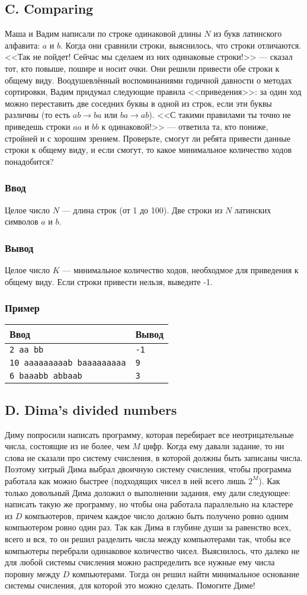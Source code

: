 \documentclass[10pt, a4paper]{article}
\newcommand{\informat}[1]
{
	\subsubsection*{Ввод} #1
}
\newcommand{\outformat}[1]
{
	\subsubsection*{Вывод} #1
}
\newcommand{\exampleee}[6]
{
	\subsubsection*{Пример}
	\noindent
	\begin{center}
	\begin{tabularx}{\linewidth}{|X|X|}
	\hline
	Ввод 	& Вывод  	\\
	\hline
	{\tt #1} & {\tt #2}	\\
	\hline
	{\tt #3} & {\tt #4}	\\
	\hline
	{\tt #5} & {\tt #6}	\\
	\hline
	\end{tabularx}
	\end{center}
}
\begin{document}
\subsection*{C. Comparing}

Маша и Вадим написали по строке одинаковой длины $N$ из букв латинского алфавита: $a$ и $b$. Когда они сравнили строки, выяснилось, что строки отличаются. <<Так не пойдет! Сейчас мы сделаем из них одинаковые строки!>> --- сказал тот, кто повыше, пошире и носит очки. Они решили привести обе строки к общему виду. Воодушевлённый воспоминаниями годичной давности о методах сортировки, Вадим придумал следующие правила <<приведения>>: за один ход можно переставить две соседних буквы в одной из строк, если эти буквы различны (то есть $ab \rightarrow ba$ или $ba \rightarrow ab$). <<С такими правилами ты точно не приведешь строки $aa$ и $bb$ к одинаковой!>> --- ответила та, кто пониже, стройней и с хорошим зрением. Проверьте, смогут ли ребята привести данные строки к общему виду, и если смогут, то какое минимальное количество ходов понадобится?

\informat{Целое число $N$ --- длина строк (от 1 до 100). Две строки из $N$ латинских символов $a$ и $b$.}

\outformat{Целое число $K$ --- минимальное количество ходов, необходмое для приведения к общему виду. Если строки привести нельзя, выведите -1.}

\exampleee{2 \newline aa \newline bb}{-1}{10 \newline aaaaaaaaab \newline baaaaaaaaa}{9}{6 \newline baaabb \newline abbaab}{3}



\subsection*{D. Dima's divided numbers}

Диму попросили написать программу, которая перебирает все неотрицательные числа, состоящие из не более, чем $M$ цифр. Когда ему давали задание, то ни слова не сказали про систему счисления, в которой должны быть записаны числа. Поэтому хитрый Дима выбрал двоичную систему счисления, чтобы программа работала как можно быстрее (подходящих чисел в ней всего лишь $2^M$). Как только довольный Дима доложил о выполнении задания, ему дали следующее: написать такую же программу, но чтобы она работала параллельно на кластере из $D$ компьютеров, причем каждое число должно быть получено ровно одним компьютером ровно один раз. Так как Дима в глубине души за равенство всех, всего и вся, то он решил разделить числа между компьютерами так, чтобы все компьютеры перебрали одинаковое количество чисел. Выяснилось, что далеко не для любой системы счисления можно распределить все нужные ему числа поровну между $D$ компьютерами. Тогда он решил найти минимальное основание системы счисления, для которой это можно сделать. Помогите Диме! 
\end{document}
